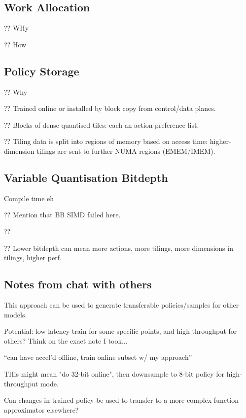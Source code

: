 \documentclass[sigconf,natbib=false]{acmart}
\begin{document}
\subsection{Work Allocation}
?? WHy

?? How

\subsection{Policy Storage}
?? Why

?? Trained online or installed by block copy from control/data planes.

?? Blocks of dense quantised tiles: each an action preference list.

?? Tiling data is split into regions of memory based on access time: higher-dimension tilings are sent to further NUMA regions (EMEM/IMEM).

\subsection{Variable Quantisation Bitdepth}
Compile time eh

?? Mention that BB SIMD failed here.

?? 

?? Lower bitdepth can mean more actions, more tilings, more dimensions in tilings, higher perf.

\subsection{Notes from chat with others}
This approach can be used to generate transferable policies/samples for other models.

Potential: low-latency train for some specific points, and high throughput for others? Think on the exact note I took...

``can have accel'd offline, train online subset w/ my approach''

THis might mean "do 32-bit online", then downsample to 8-bit policy for high-throughput mode.

Can changes in trained policy be used to transfer to a more complex function approximator elsewhere?
\end{document}
